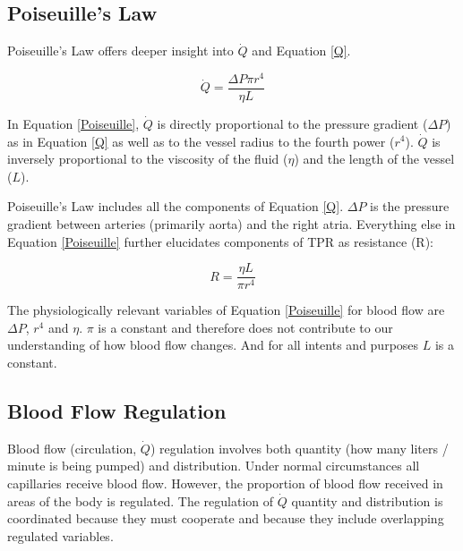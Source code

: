 \subsection{Poiseuille's Law}

Poiseuille's Law offers deeper insight into $\dot{Q}$ and Equation \ref{Q}.

\begin{equation}
    \dot{Q} = \frac{\Delta P \pi r^4}{\eta L}
    \label{Poiseuille}
\end{equation}

In Equation \ref{Poiseuille}, $\dot{Q}$ is directly proportional to the pressure gradient ($\Delta P$) as in Equation \ref{Q} as well as to the vessel radius to the fourth power ($r^4$). $\dot{Q}$ is inversely proportional to the viscosity of the fluid ($\eta$) and the length of the vessel ($L$). 

Poiseuille's Law includes all the components of Equation \ref{Q}. $\Delta P$ is the pressure gradient between arteries (primarily aorta) and the right atria. Everything else in Equation \ref{Poiseuille} further elucidates components of TPR as resistance (R):

\begin{equation}
    R = \frac{\eta L}{\pi r^4}
    \label{resistance}
\end{equation}

The physiologically relevant variables of Equation \ref{Poiseuille} for blood flow are $\Delta P$, $r^4$ and $\eta$. $\pi$ is a constant and therefore does not contribute to our understanding of how blood flow changes. And for all intents and purposes $L$ is a constant. 

\subsection{Blood Flow Regulation}

Blood flow (circulation, $\dot{Q}$) regulation involves both quantity (how many liters / minute is being pumped) and distribution. Under normal circumstances all capillaries receive blood flow. However, the proportion of blood flow received in areas of the body is regulated. The regulation of $\dot{Q}$ quantity and distribution is coordinated because they must cooperate and because they include overlapping regulated variables. 

